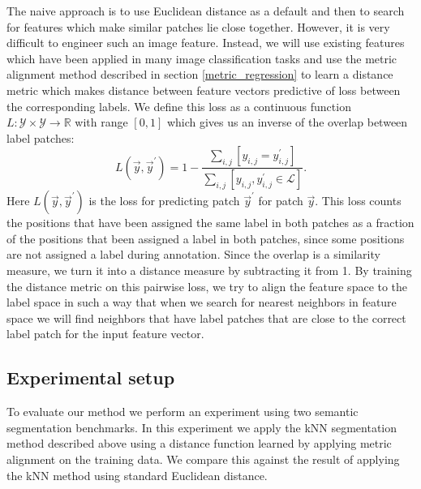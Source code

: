 The naive approach is to use Euclidean distance as a default and then to search for features which make similar patches lie close together. However, it is very difficult to engineer such an image feature. Instead, we will use existing features which have been applied in many image classification tasks and use the metric alignment method described in section \ref{metric_regression} to learn a distance metric which makes distance between feature vectors predictive of loss between the corresponding labels. We define this loss as a continuous function $L: \mathcal{Y} \times \mathcal{Y} \rightarrow \mathbb{R}$ with range $[0,1]$ which gives us an inverse of the overlap between label patches:
\begin{equation}
L(\vec{y}, \vec{y}^\prime) = 1 - \frac{\sum_{i,j} \left [ y_{i,j} = y^\prime_{i,j}\right]}{\sum_{i,j} \left [y_{i,j}, y^\prime_{i,j} \in \mathcal{L}\right ]}.
\label{eq:patch_loss}
\end{equation}
Here $L(\vec{y}, \vec{y}^\prime)$ is the loss for predicting patch $\vec{y}^\prime$ for patch $\vec{y}$. This loss counts the positions that have been assigned the same label in both patches as a fraction of the positions that been assigned a label in both patches, since some positions are not assigned a label during annotation. Since the overlap is a similarity measure, we turn it into a distance measure by subtracting it from 1. By training the distance metric on this pairwise loss, we try to align the feature space to the label space in such a way that when we search for nearest neighbors in feature space we will find neighbors that have label patches that are close to the correct label patch for the input feature vector.




\subsection{Experimental setup}

To evaluate our method we perform an experiment using two semantic segmentation benchmarks. In this experiment we apply the \ac{kNN} segmentation method described above using a distance function learned by applying metric alignment on the training data. We compare this against the result of applying the \ac{kNN} method using standard Euclidean distance.

